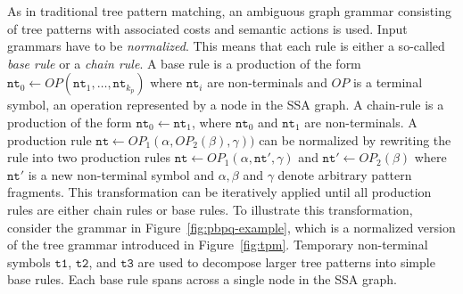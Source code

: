 As in traditional tree pattern matching, an ambiguous graph grammar
consisting of tree patterns with associated costs and semantic actions
is used. Input grammars have to be \emph{normalized}. This means that
each rule is either a so-called \emph{base rule} or a \emph{chain  rule}. A base rule is a production of the form $\texttt{nt}_0
\leftarrow \textit{OP} ( \texttt{nt}_1, \dots, \texttt{nt}_{k_p} )$
where $\texttt{nt}_i$ are non-terminals and $\textit{OP}$ is a
terminal symbol, \ie an operation represented by a node in the SSA
graph. A chain-rule is a production of the form $\texttt{nt}_0
\leftarrow \texttt{nt}_1$, where $\texttt{nt}_0$ and $\texttt{nt}_1$
are non-terminals.  A production rule $\texttt{nt} \leftarrow
\textit{OP}_1 ( \alpha, \textit{OP}_2 (\beta), \gamma))$ can be
normalized by rewriting the rule into two production rules
$\texttt{nt} \leftarrow \textit{OP}_1 ( \alpha, \texttt{nt}' ,
\gamma)$ and $\texttt{nt}' \leftarrow \textit{OP}_2 ( \beta)$ where
$\texttt{nt}'$ is a new non-terminal symbol and $\alpha,\beta$ and
$\gamma$ denote arbitrary pattern fragments.  This transformation can
be iteratively applied until all production rules are either chain
rules or base rules.  To illustrate this transformation, consider the
grammar in Figure~\ref{fig:pbpq-example}, which is a normalized
version of the tree grammar introduced in
Figure~\ref{fig:tpm}. Temporary non-terminal symbols $\texttt{t1}$,
$\texttt{t2}$, and $\texttt{t3}$ are used to decompose larger tree
patterns into simple base rules. Each base rule spans across a single
node in the SSA graph.


